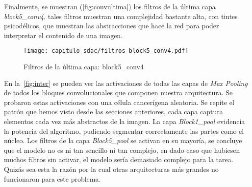 Finalmente, se muestran (\autoref{fig:convultima}) los filtros de la última capa
\emph{block5\_conv4}, tales filtros muestran una complejidad bastante alta, con
tintes psicodélicos, que muestran las abstracciones que hace la red para poder
interpretar el contenido de una imagen.

\begin{figure}[H] 
  \centering
  \texttt{[image: capitulo\_sdac/filtros-block5\_conv4.pdf]}
  \caption{Filtros de la última capa: block5\_conv4}\label{fig:convultima}
\end{figure}

En la~\autoref{fig:inter} se pueden ver las activaciones de todas las capas de
\emph{Max Pooling} de todos los bloques convolucionales que componen nuestra
arquitectura. Se probaron estas activaciones con una célula cancerígena
aleatoria. Se repite el patrón que hemos visto desde las secciones anteriores,
cada capa captura elementos cada vez más abstractos de la imagen. La capa
\emph{Block1\_pool} evidencia la potencia del algoritmo, pudiendo segmentar
correctamente las partes como el núcleo. Los filtros de la capa
\emph{Block5\_pool} se activan en su mayoría, se concluye que el modelo no es ni
tan sencillo ni tan complejo, en dado caso que hubiesen muchos filtros sin
activar, el modelo sería demasiado complejo para la tarea. Quizás sea esta la
razón por la cual otras arquitecturas más grandes no funcionaron para este
problema.

